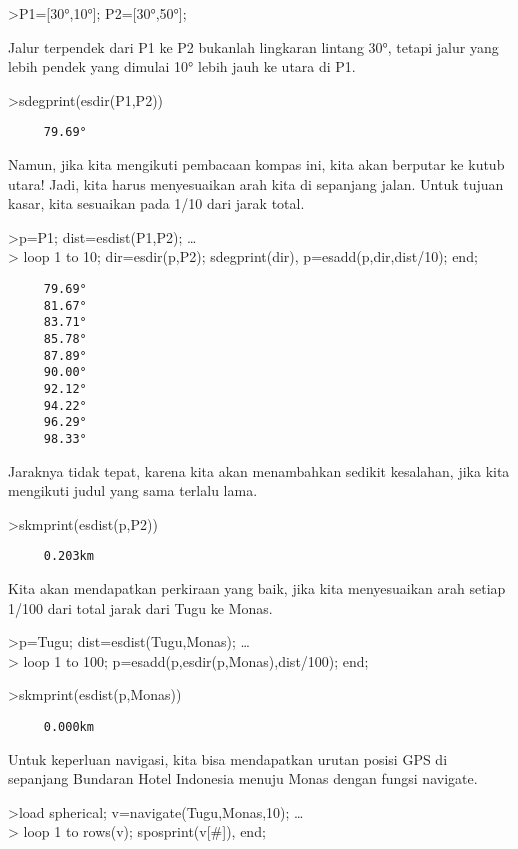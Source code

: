 \documentclass[
]{book}
\begin{document}
\textgreater P1={[}30°,10°{]}; P2={[}30°,50°{]};

Jalur terpendek dari P1 ke P2 bukanlah lingkaran lintang 30°, tetapi jalur yang lebih pendek yang dimulai 10° lebih jauh ke utara di P1.

\textgreater sdegprint(esdir(P1,P2))

\begin{verbatim}
     79.69°
\end{verbatim}

Namun, jika kita mengikuti pembacaan kompas ini, kita akan berputar ke kutub utara! Jadi, kita harus menyesuaikan arah kita di sepanjang jalan. Untuk tujuan kasar, kita sesuaikan pada 1/10 dari jarak total.

\textgreater p=P1; dist=esdist(P1,P2); \ldots{}\\
\textgreater{} loop 1 to 10; dir=esdir(p,P2); sdegprint(dir), p=esadd(p,dir,dist/10); end;

\begin{verbatim}
     79.69°
     81.67°
     83.71°
     85.78°
     87.89°
     90.00°
     92.12°
     94.22°
     96.29°
     98.33°
\end{verbatim}

Jaraknya tidak tepat, karena kita akan menambahkan sedikit kesalahan, jika kita mengikuti judul yang sama terlalu lama.

\textgreater skmprint(esdist(p,P2))

\begin{verbatim}
     0.203km
\end{verbatim}

Kita akan mendapatkan perkiraan yang baik, jika kita menyesuaikan arah setiap 1/100 dari total jarak dari Tugu ke Monas.

\textgreater p=Tugu; dist=esdist(Tugu,Monas); \ldots{}\\
\textgreater{} loop 1 to 100; p=esadd(p,esdir(p,Monas),dist/100); end;

\textgreater skmprint(esdist(p,Monas))

\begin{verbatim}
     0.000km
\end{verbatim}

Untuk keperluan navigasi, kita bisa mendapatkan urutan posisi GPS di sepanjang Bundaran Hotel Indonesia menuju Monas dengan fungsi navigate.

\textgreater load spherical; v=navigate(Tugu,Monas,10); \ldots{}\\
\textgreater{} loop 1 to rows(v); sposprint(v{[}\#{]}), end;
\end{document}
